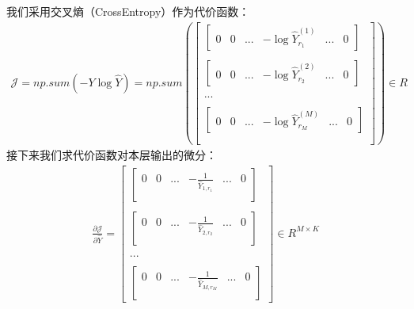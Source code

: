 \documentclass[UTF8]{article}
\begin{document}
我们采用交叉熵（CrossEntropy）作为代价函数：
\begin{equation}
\begin{aligned}
\mathcal{J}=np.sum(-Y \log{\hat{Y}})=np.sum(\begin{bmatrix}
\begin{bmatrix}
0 & 0 & ... & -\log{\hat{Y}_{r_{1}}^{(1)}} & ... & 0
\end{bmatrix} \\ \\
\begin{bmatrix}
0 & 0 & ... & -\log{\hat{Y}_{r_{2}}^{(2)}} & ... & 0
\end{bmatrix} \\ \\
... \\ \\
\begin{bmatrix}
0 & 0 & ... & -\log{\hat{Y}_{r_{M}}^{(M)}} & ... & 0
\end{bmatrix} \\ \\
\end{bmatrix}) \in R
\end{aligned}
\label{mlp-mini-batch-cross-entropy-def}
\end{equation}
接下来我们求代价函数对本层输出的微分：
\begin{equation}
\begin{aligned}
\frac{\partial{\mathcal{J}}}{\partial{\hat{Y}}}=\begin{bmatrix}
\begin{bmatrix}
0 & 0 & ... & -\frac{1}{\hat{Y}_{1,r_{1}}} & ... & 0 \\
\end{bmatrix} \\ \\
\begin{bmatrix}
0 & 0 & ... & -\frac{1}{\hat{Y}_{2,r_{2}}} & ... & 0 \\
\end{bmatrix} \\ \\
... \\ \\
\begin{bmatrix}
0 & 0 & ... & -\frac{1}{\hat{Y}_{M,r_{M}}} & ... & 0 \\
\end{bmatrix}
 \end{bmatrix} \in R^{M \times K}
\end{aligned}
\label{mlp-pJ-PYhat-def}
\end{equation}
\end{document}
